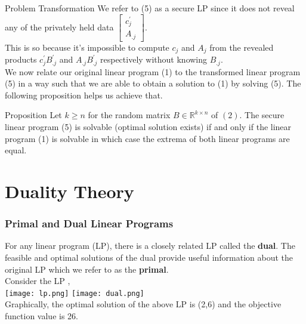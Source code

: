 \documentclass[9pt]{beamer}
\begin{document}
\begin{frame}{Problem Transformation}
We refer to (5) as a secure LP since it does not reveal any of the privately held data $
\left[\begin{array}{c}
c_{j}^{\prime} \\
A_{. j}
\end{array}\right]
$.\\
\vspace{0.3cm}
This is so because it's impossible to compute $ c_j $ and $ A_j $ from the revealed \\ products $ c_{j}^{\prime} B_{.j}^{\prime} $ and $ A_{.j}B_{.j}^{\prime} $ respectively without knowing $ B_{.j} $.\\

\vspace{0.2cm}
We now relate our original linear program (1) to the transformed linear program (5) in a way such that we are able to obtain a solution to (1) by solving (5). The following proposition helps us achieve that. 

\begin{block}{Proposition}
Let $k \geq n$ for the random matrix $B \in \mathbb{R}^{k \times n}$ of $(2) $. The secure linear program (5) is solvable (optimal solution exists) if and only if the linear program (1) is solvable in which case the extrema of both linear programs are equal.
\end{block}
\end{frame}


\section{Duality Theory}

\begin{frame}
\frametitle{Primal and Dual Linear Programs}
For any linear program (LP), there is a closely related LP called the \textbf{dual}. The feasible and optimal solutions of the dual provide useful information about the original LP which we refer to as the \textbf{primal}.\\

\vspace{0.1cm}
Consider the LP ,\\
\texttt{[image: lp.png]}
\hfill\texttt{[image: dual.png]}\\

Graphically, the optimal solution of the above LP is (2,6) and the objective function value is 26. 
\end{frame}
\end{document}
